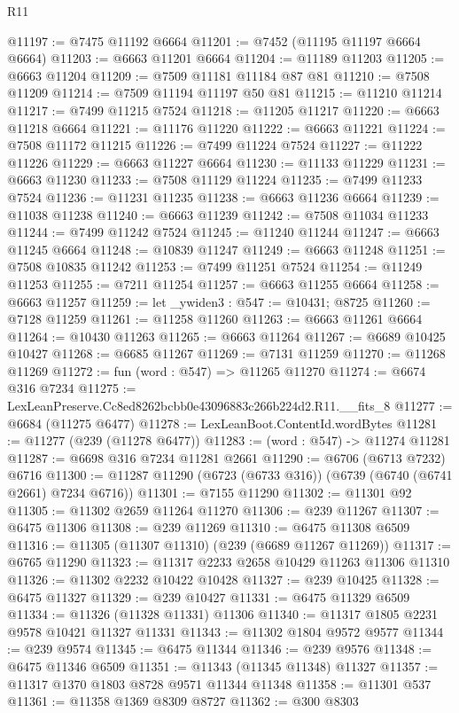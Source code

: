 \begin{lexlean}{R11}
\begin{coremodule}
@11197 := @7475 @11192 @6664
@11201 := @7452 (@11195 @11197 @6664 @6664)
@11203 := @6663 @11201 @6664
@11204 := @11189 @11203
@11205 := @6663 @11204
@11209 := @7509 @11181 @11184 @87 @81
@11210 := @7508 @11209
@11214 := @7509 @11194 @11197 @50 @81
@11215 := @11210 @11214
@11217 := @7499 @11215 @7524
@11218 := @11205 @11217
@11220 := @6663 @11218 @6664
@11221 := @11176 @11220
@11222 := @6663 @11221
@11224 := @7508 @11172 @11215
@11226 := @7499 @11224 @7524
@11227 := @11222 @11226
@11229 := @6663 @11227 @6664
@11230 := @11133 @11229
@11231 := @6663 @11230
@11233 := @7508 @11129 @11224
@11235 := @7499 @11233 @7524
@11236 := @11231 @11235
@11238 := @6663 @11236 @6664
@11239 := @11038 @11238
@11240 := @6663 @11239
@11242 := @7508 @11034 @11233
@11244 := @7499 @11242 @7524
@11245 := @11240 @11244
@11247 := @6663 @11245 @6664
@11248 := @10839 @11247
@11249 := @6663 @11248
@11251 := @7508 @10835 @11242
@11253 := @7499 @11251 @7524
@11254 := @11249 @11253
@11255 := @7211 @11254
@11257 := @6663 @11255 @6664
@11258 := @6663 @11257
@11259 := let _ywiden3 : @547 := @10431; @8725
@11260 := @7128 @11259
@11261 := @11258 @11260
@11263 := @6663 @11261 @6664
@11264 := @10430 @11263
@11265 := @6663 @11264
@11267 := @6689 @10425 @10427
@11268 := @6685 @11267
@11269 := @7131 @11259
@11270 := @11268 @11269
@11272 := fun (word : @547) => @11265 @11270
@11274 := @6674 @316 @7234
@11275 := LexLeanPreserve.Cc8ed8262bcbb0e43096883c266b224d2.R11.__fits_8
@11277 := @6684 (@11275 @6477)
@11278 := LexLeanBoot.ContentId.wordBytes
@11281 := @11277 (@239 (@11278 @6477))
@11283 := (word : @547) -> @11274 @11281
@11287 := @6698 @316 @7234 @11281 @2661
@11290 := @6706 (@6713 @7232) @6716
@11300 := @11287 @11290 (@6723 (@6733 @316)) (@6739 (@6740 (@6741 @2661) @7234 @6716))
@11301 := @7155 @11290
@11302 := @11301 @92
@11305 := @11302 @2659 @11264 @11270
@11306 := @239 @11267
@11307 := @6475 @11306
@11308 := @239 @11269
@11310 := @6475 @11308 @6509
@11316 := @11305 (@11307 @11310) (@239 (@6689 @11267 @11269))
@11317 := @6765 @11290
@11323 := @11317 @2233 @2658 @10429 @11263 @11306 @11310
@11326 := @11302 @2232 @10422 @10428
@11327 := @239 @10425
@11328 := @6475 @11327
@11329 := @239 @10427
@11331 := @6475 @11329 @6509
@11334 := @11326 (@11328 @11331) @11306
@11340 := @11317 @1805 @2231 @9578 @10421 @11327 @11331
@11343 := @11302 @1804 @9572 @9577
@11344 := @239 @9574
@11345 := @6475 @11344
@11346 := @239 @9576
@11348 := @6475 @11346 @6509
@11351 := @11343 (@11345 @11348) @11327
@11357 := @11317 @1370 @1803 @8728 @9571 @11344 @11348
@11358 := @11301 @537
@11361 := @11358 @1369 @8309 @8727
@11362 := @300 @8303

\end{coremodule}
\end{lexlean}
